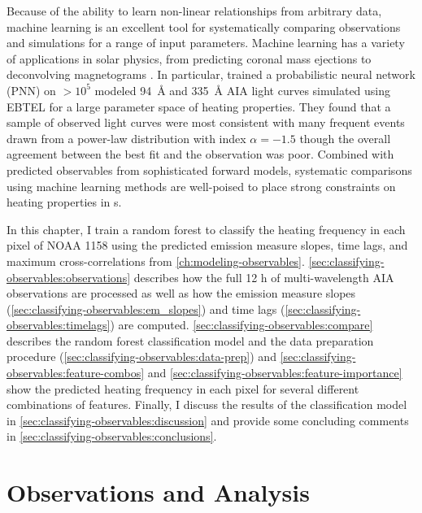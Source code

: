 Because of the ability to learn non-linear relationships from arbitrary data, machine learning  is an excellent tool for systematically comparing observations and simulations for a range of input parameters. Machine learning has a variety of applications in solar physics, from predicting coronal mass ejections \citep[e.g.][]{bobra_predicting_2016} to deconvolving magnetograms \citep{baso_enhancing_2018}. In particular, \citet{tajfirouze_time-resolved_2016} trained a probabilistic neural network (PNN) on  $>10^5$ modeled \SI{94}{\angstrom} and \SI{335}{\angstrom} AIA light curves simulated using EBTEL for a large parameter space of heating properties. They found that a sample of observed light curves were most consistent with many frequent events drawn from a power-law distribution with index $\alpha=-1.5$ though the overall agreement between the best fit and the observation was poor. Combined with predicted observables from sophisticated forward models, systematic comparisons using machine learning methods are well-poised to place strong constraints on heating properties in \AR s.

In this chapter, I train a random forest to classify the heating frequency in each pixel of \AR{} NOAA 1158 using the predicted emission measure slopes, time lags, and maximum cross-correlations from \autoref{ch:modeling-observables}. \autoref{sec:classifying-observables:observations} describes how the full 12 \si{\hour} of multi-wavelength AIA observations are processed as well as how the emission measure slopes (\autoref{sec:classifying-observables:em_slopes}) and time lags (\autoref{sec:classifying-observables:timelags}) are computed. \autoref{sec:classifying-observables:compare} describes the random forest classification model and the data preparation procedure (\autoref{sec:classifying-observables:data-prep}) and \autoref{sec:classifying-observables:feature-combos} and \ref{sec:classifying-observables:feature-importance} show the predicted heating frequency in each pixel for several different combinations of features. Finally, I discuss the results of the classification model in \autoref{sec:classifying-observables:discussion} and provide some concluding comments in \autoref{sec:classifying-observables:conclusions}.

\section{Observations and Analysis}\label{sec:classifying-observables:observations}

